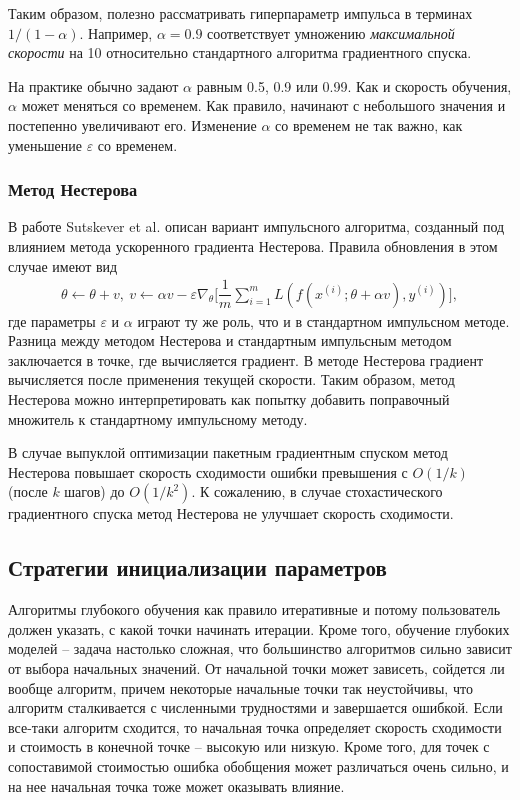 \documentclass[%
	11pt,
	a4paper,
	utf8,
]{article}
\begin{document}
Таким образом, полезно рассматривать гиперпараметр импульса в терминах $ 1 / (1 - \alpha) $. Например, $ \alpha = 0.9 $ соответствует умножению \emph{максимальной скорости} на 10 относительно стандартного алгоритма градиентного спуска.

На практике обычно задают $ \alpha $ равным 0.5, 0.9 или 0.99. Как и скорость обучения, $ \alpha $ может меняться со временем. Как правило, начинают с небольшого значения и постепенно увеличивают его. Изменение $ \alpha $ со временем не так важно, как уменьшение $ \varepsilon $ со временем.

\subsubsection{Метод Нестерова}

В работе Sutskever et al. описан вариант импульсного алгоритма, созданный под влиянием метода ускоренного градиента Нестерова. Правила обновления в этом случае имеют вид
\begin{align*}
	\theta \leftarrow \theta + v, \ v \leftarrow \alpha v - \varepsilon \nabla_{\theta} \Big[ \dfrac{1}{m} \sum_{i=1}^{m} L(f(x^{(i)}; \theta +\alpha v), y^{(i)}) \Big],
\end{align*}
где параметры $ \varepsilon $ и $ \alpha $ играют ту же роль, что и в стандартном импульсном методе. Разница между методом Нестерова и стандартным импульсным методом заключается в точке, где вычисляется градиент. В методе Нестерова градиент вычисляется после применения текущей скорости. Таким образом, метод Нестерова можно интерпретировать как попытку добавить поправочный множитель к стандартному импульсному методу.

В случае выпуклой оптимизации пакетным градиентным спуском метод Нестерова повышает скорость сходимости ошибки превышения с $ O(1/k) $ (после $ k $ шагов) до $ O(1 / k^2) $. К сожалению, в случае стохастического градиентного спуска метод Нестерова не улучшает скорость сходимости.

\subsection{Стратегии инициализации параметров}

Алгоритмы глубокого обучения как правило итеративные и потому пользователь должен указать, с какой точки начинать итерации. Кроме того, обучение глубоких моделей -- задача настолько сложная, что большинство алгоритмов сильно зависит от выбора начальных значений. От начальной точки может зависеть, сойдется ли вообще алгоритм, причем некоторые начальные точки так неустойчивы, что алгоритм сталкивается с численными трудностями и завершается ошибкой. Если все-таки алгоритм сходится, то начальная точка определяет скорость сходимости и стоимость в конечной точке -- высокую или низкую. Кроме того, для точек с сопоставимой стоимостью ошибка обобщения может различаться очень сильно, и на нее начальная точка тоже может оказывать влияние.
\end{document}
